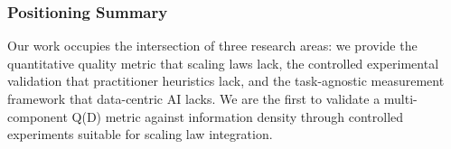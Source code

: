 \subsubsection{Positioning Summary}

Our work occupies the intersection of three research areas: we provide the quantitative quality metric that scaling laws lack, the controlled experimental validation that practitioner heuristics lack, and the task-agnostic measurement framework that data-centric AI lacks. We are the first to validate a multi-component Q(D) metric against information density through controlled experiments suitable for scaling law integration.

